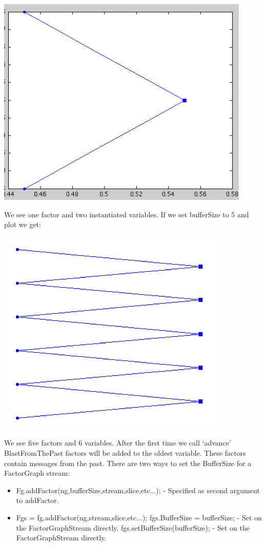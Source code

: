 \includegraphics{images/BufferSize1.png}

We see one factor and two instantiated variables.  If we set bufferSize to 5 and plot we get:

\includegraphics{images/BufferSize5.png}


We see five factors and 6 variables.  After the first time we call `advance' BlastFromThePast factors will be added to the oldest variable.  These factors contain messages from the past. 
There are two ways to set the BufferSize for a FactorGraph stream:

\begin{itemize}
\item Fg.addFactor(ng,bufferSize,stream,slice,etc...); - Specified as second argument to addFactor.
\item Fgs = fg.addFactor(ng,stream,slice,etc...);
\ifmatlab
fgs.BufferSize = bufferSize; - Set on the FactorGraphStream directly.
\fi
\ifjava
fgs.setBufferSize(bufferSize); - Set on the FactorGraphStream directly.
\fi
\end{itemize}

